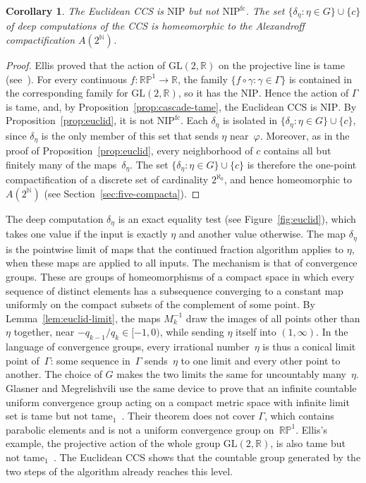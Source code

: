 \documentclass[psamsfonts]{amsart}
\newtheorem{cor}[thm]{Corollary}
\theoremstyle{definition}
\theoremstyle{remark}
\newcommand{\NIP}{\text{NIP}}
\newcommand{\RP}{\mathbb{R}\mathbb{P}}
\numberwithin{equation}{section}
\begin{document}
\begin{cor}\label{cor:euclid}
The Euclidean CCS is $\NIP$ but not $\NIP^{\mathrm{fc}}$.
The set $\{\delta_\eta:\eta\in G\}\cup\{c\}$ of deep computations of the CCS is homeomorphic to the Alexandroff compactification
$A(2^{\mathbb{N}})$.
\end{cor}

\begin{proof}
Ellis proved that the action of $\mathrm{GL}(2,\mathbb{R})$ on the projective line is
tame~\cite{Ellis1993} (see~\cite[Example~5.7]{glasner2022tame}).
For every continuous $f\colon\RP^1\to\mathbb{R}$, the family
$\{f\circ\gamma:\gamma\in\Gamma\}$ is contained in the corresponding family for
$\mathrm{GL}(2,\mathbb{R})$, so it has the $\NIP$.
Hence the action of $\Gamma$ is tame, and, by
Proposition~\ref{prop:cascade-tame}, the Euclidean CCS is $\NIP$.
By Proposition~\ref{prop:euclid}, it is not $\NIP^{\mathrm{fc}}$.
Each $\delta_\eta$ is isolated in $\{\delta_\eta:\eta\in G\}\cup\{c\}$, since $\delta_\eta$ is the only member of this set that sends $\eta$ near~$\varphi$.
Moreover, as in the proof of Proposition~\ref{prop:euclid}, every neighborhood of $c$ contains all but finitely many of the maps~$\delta_\eta$.
The set $\{\delta_\eta:\eta\in G\}\cup\{c\}$ is therefore the one-point compactification of a discrete set of cardinality $2^{\aleph_0}$, and hence homeomorphic to $A(2^{\mathbb{N}})$ (see Section~\ref{sec:five-compacta}).
\end{proof}

The deep computation $\delta_\eta$ is an exact equality test (see Figure~\ref{fig:euclid}), which takes one value if the input is exactly $\eta$ and another value otherwise.
The map $\delta_\eta$ is the pointwise limit of maps that the continued fraction algorithm applies to $\eta$, when these maps are applied to all inputs.
The mechanism is that of convergence groups.
These are groups of homeomorphisms of a compact space in which every sequence of distinct elements has a subsequence converging to a constant map uniformly on the compact subsets of the complement of some point.
By Lemma~\ref{lem:euclid-limit}, the maps $M_k^{-1}$ draw the images of all
points other than $\eta$ together, near $-q_{k-1}/q_k\in[-1,0)$, while sending $\eta$ itself into $(1,\infty)$.
In the language of convergence groups, every irrational number~$\eta$ is thus a conical limit point of~$\Gamma$: some sequence in~$\Gamma$ sends~$\eta$ to one limit and every other point to another.
The choice of $G$ makes the two limits the same for uncountably many~$\eta$.
Glasner and Megrelishvili use the same device to prove that an infinite
countable uniform convergence group acting on a compact metric space with
infinite limit set is tame but not
tame$_1$~\cite[Proposition~6.1 and Theorem~6.5]{glasner2022tame}.
Their theorem does not cover $\Gamma$, which contains parabolic elements and is
not a uniform convergence group on~$\RP^1$.
Ellis's example, the projective action of the whole group
$\mathrm{GL}(2,\mathbb{R})$, is also tame but not
tame$_1$~\cite[Example~5.7]{glasner2022tame}.
The Euclidean CCS shows that the countable group generated by the two steps of the algorithm already reaches this level.
\end{document}
